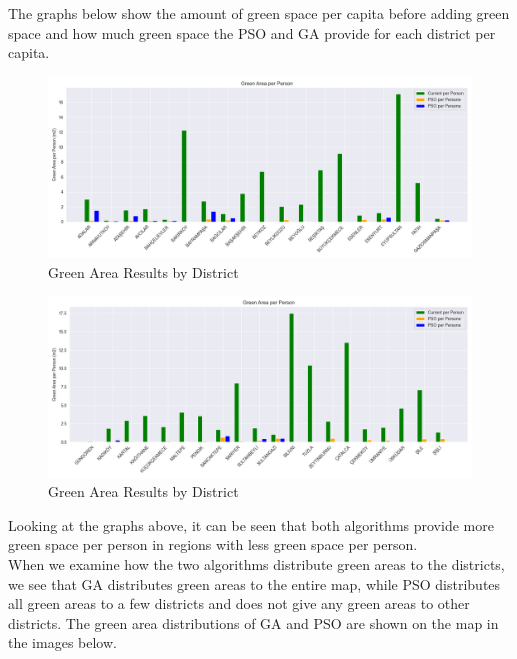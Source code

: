 \documentclass[conference]{IEEEtran}
\begin{document}
The graphs below show the amount of green space per capita before adding green space and how much green space the PSO and GA provide for each district per capita.

\begin{figure}[H]
    \centering
    \includegraphics[width=1.0\linewidth]{group1.png}
    \caption{Green Area Results by District}
    \label{fig:green_areas_per_capita_1}
\end{figure}

\begin{figure}[H]
    \centering
    \includegraphics[width=1.0\linewidth]{group2.png}
    \caption{Green Area Results by District}
    \label{fig:green_areas_per_capita_2}
\end{figure}

Looking at the graphs above, it can be seen that both algorithms provide more green space per person in regions with less green space per person.\\

When we examine how the two algorithms distribute green areas to the districts, we see that GA distributes green areas to the entire map, while PSO distributes all green areas to a few districts and does not give any green areas to other districts. The green area distributions of GA and PSO are shown on the map in the images below.
\end{document}
